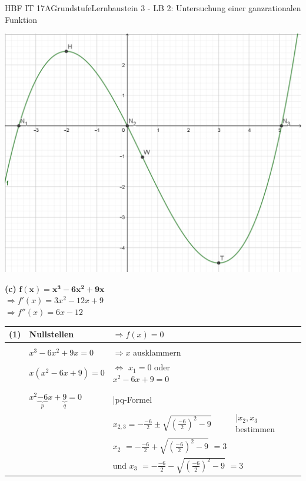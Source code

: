\documentclass[oneside,openany,headings=optiontotoc,11pt,numbers=noenddot]{scrreprt}
\begin{document}
\begin{worksheet}{HBF IT 17A}{Grundstufe}{Lernbaustein 3 - LB 2: Untersuchung einer ganzrationalen Funktion}
\begin{framed}
			\includegraphics[scale=0.4]{Bilder/HAb.png}
		\end{framed}
		\newpage
		\begin{framed}
			\noindent
			\textbf{(c)} \(\mathbf{f(x) = x^3 -6x^2 +9x}\)\\
			\(\Rightarrow f'(x) = 3x^2 -12x+9\)\\
			\(\Rightarrow f''(x) = 6x -12\)\\
			\par\noindent
			\begin{tabularx}{\textwidth}{lXXl}
				(1) & Nullstellen & \(\Rightarrow f(x) = 0\)\\
				\hline\\
				& \(x^3 -6x^2 + 9x = 0\) & \(\Rightarrow x\) ausklammern\\
				& \(x(x^2 -6x +9) = 0\) & \(\Leftrightarrow\) \colorbox{green!10}{\(x_1 = 0\)} oder \(x^2 -6x+9 = 0\)\\
				\cline{1-2}\\
				& \(x^2 \underbrace{-6}_{p}x +\underbrace{9}_{q} = 0\) & |pq-Formel\\
				& & \(x_{2,3} = -\frac{-6}{2} \pm \sqrt{\left(\frac{-6}{2}\right)^2 -9}\) & |\(x_2,x_3\) bestimmen\\
				& & \multicolumn{2}{l}{\colorbox{green!10}{\(x_2\)} \(= -\frac{-6}{2} + \sqrt{\left(\frac{-6}{2}\right)^2 -9}\) \colorbox{green!10}{\(= 3\)}}\\
				& & \multicolumn{2}{l}{und \colorbox{green!10}{\(x_3\)} \(= -\frac{-6}{2} - \sqrt{\left(\frac{-6}{2}\right)^2 -9}\) \colorbox{green!10}{\(=3\)}}\\

\end{tabularx}
\end{framed}
\end{worksheet}
\end{document}
